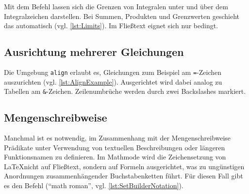 Mit dem Befehl \texttt{\limits} lassen sich die Grenzen von Integralen unter und über dem Integralzeichen darstellen.
Bei Summen, Produkten und Grenzwerten geschieht das automatisch (vgl. \cref{lst:Limits}).
Im Fließtext eignet sich \texttt{\limits} nur bedingt.


\subsection{Ausrichtung mehrerer Gleichungen}

Die Umgebung \texttt{align} erlaubt es, Gleichungen zum Beispiel am \texttt{=}-Zeichen auszurichten (vgl. \cref{lst:AlignExample}).
Ausgerichtet wird dabei analog zu Tabellen am \texttt{\&}-Zeichen.
Zeilenumbrüche werden durch zwei Backslashes markiert.


\subsection{Mengenschreibweise}

Manchmal ist es notwendig, im Zusammenhang mit der Mengenschreibweise Prädikate unter Verwendung von textuellen Beschreibungen oder längeren Funktionsnamen zu definieren.
Im Mathmode wird die Zeichensetzung von \LaTeX nicht auf Fließtext, sondern auf Formeln ausgerichtet, was zu ungünstigen Anordnungen zusammenhängender Buchstabenketten führt.
Für diesen Fall gibt es den Befehl \texttt{\mathrm{}} (\enquote{math roman}, vgl. \cref{lst:SetBuilderNotation}).

